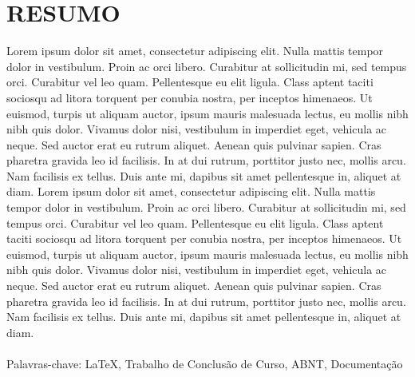 \chapter*{RESUMO}

Lorem ipsum dolor sit amet, consectetur adipiscing elit. Nulla mattis tempor dolor in vestibulum. Proin ac orci libero. Curabitur at sollicitudin mi, sed tempus orci. Curabitur vel leo quam. Pellentesque eu elit ligula. Class aptent taciti sociosqu ad litora torquent per conubia nostra, per inceptos himenaeos. Ut euismod, turpis ut aliquam auctor, ipsum mauris malesuada lectus, eu mollis nibh nibh quis dolor. Vivamus dolor nisi, vestibulum in imperdiet eget, vehicula ac neque. Sed auctor erat eu rutrum aliquet. Aenean quis pulvinar sapien. Cras pharetra gravida leo id facilisis. In at dui rutrum, porttitor justo nec, mollis arcu. Nam facilisis ex tellus. Duis ante mi, dapibus sit amet pellentesque in, aliquet at diam. Lorem ipsum dolor sit amet, consectetur adipiscing elit. Nulla mattis tempor dolor in vestibulum. Proin ac orci libero. Curabitur at sollicitudin mi, sed tempus orci. Curabitur vel leo quam. Pellentesque eu elit ligula. Class aptent taciti sociosqu ad litora torquent per conubia nostra, per inceptos himenaeos. Ut euismod, turpis ut aliquam auctor, ipsum mauris malesuada lectus, eu mollis nibh nibh quis dolor. Vivamus dolor nisi, vestibulum in imperdiet eget, vehicula ac neque. Sed auctor erat eu rutrum aliquet. Aenean quis pulvinar sapien. Cras pharetra gravida leo id facilisis. In at dui rutrum, porttitor justo nec, mollis arcu. Nam facilisis ex tellus. Duis ante mi, dapibus sit amet pellentesque in, aliquet at diam.
\\
\\
Palavras-chave: LaTeX, Trabalho de Conclusão de Curso, ABNT, Documentação